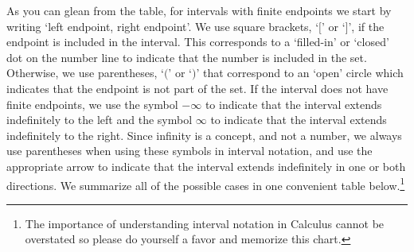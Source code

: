 \documentclass[11pt]{article}
\theoremstyle{definition}  %
\begin{document}
As you can glean from the table, for intervals with finite endpoints we start by writing `left endpoint, right endpoint'.  We use square brackets, `$[$' or `$]$', if the endpoint is included in the interval. This corresponds to a `filled-in' or `closed' dot on the number line to indicate that the number is included in the set.  Otherwise, we use parentheses, `$($' or `$)$' that correspond to an `open' circle which indicates that the endpoint is not part of the set.  If the interval does not have finite endpoints, we use the symbol $-\infty$ to indicate that the interval extends indefinitely to the left and the symbol $\infty$ to indicate that the interval extends indefinitely to the right.  Since infinity is a concept, and not a number, we always use parentheses when using these symbols in interval notation, and use the appropriate arrow to indicate that the interval extends indefinitely in one or both directions. We summarize all of the possible cases in one convenient table below.\footnote{The importance of understanding interval notation in Calculus cannot be overstated so please do yourself a favor and memorize this chart.}

\medskip

\label{intervalnotationsummary}
\end{document}
